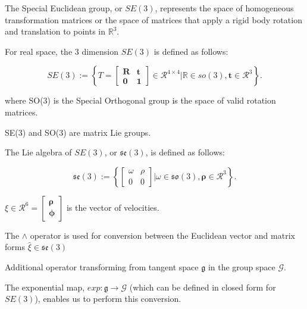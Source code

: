 \documentclass{article}
\begin{document}
The Special Euclidean group, or $SE(3)$, represents the space
of homogeneous transformation matrices or the space of matrices that apply a rigid body rotation and translation to points in $\mathbb{R}^{3}$.

For real space, the 3 dimension $SE(3)$ is defined as follows:

\begin{equation}
	SE(3) := \left\{ T = 
	\begin{bmatrix}
		\mathbf{R} & \mathbf{t}\\
		\mathbf{0} & \mathbf{1}
	\end{bmatrix} \in \mathcal{R}^{4 \times 4} | \mathbb{R} \in {so}(3), \mathbf{t} \in \mathcal{R}^3
	\right\}.
\end{equation}

where SO(3) is the Special Orthogonal group is the space of
valid rotation matrices.

SE(3) and SO(3) are matrix Lie groups.


The Lie algebra of $SE(3)$, or $\mathfrak{se}(3)$, is defined as
follows:

\begin{equation}
	\mathfrak{se}(3) := \left\{ 
	\begin{bmatrix}
		\omega & \rho\\
		0 & 0
	\end{bmatrix} | \omega \in \mathfrak{so}(3), \mathbf{\rho} \in \mathcal{R}^3
	\right\}.
\end{equation}

$\xi \in \mathcal{R}^6 = \begin{bmatrix}
\mathbf{\rho}\\
\mathbf{\phi} 
\end{bmatrix}$ is the vector of velocities.

The $\wedge$ operator is used for conversion between the Euclidean vector and matrix
forms $\hat \xi \in \mathfrak{se}(3)$

Additional operator transforming from tangent space $\mathfrak{g}$ in the
group space $\mathcal{G}$.

The exponential map, $exp : \mathfrak{g} \xrightarrow{} \mathcal{G}$ (which can
be defined in closed form for $SE(3)$), enables us to perform this
conversion.
\end{document}
